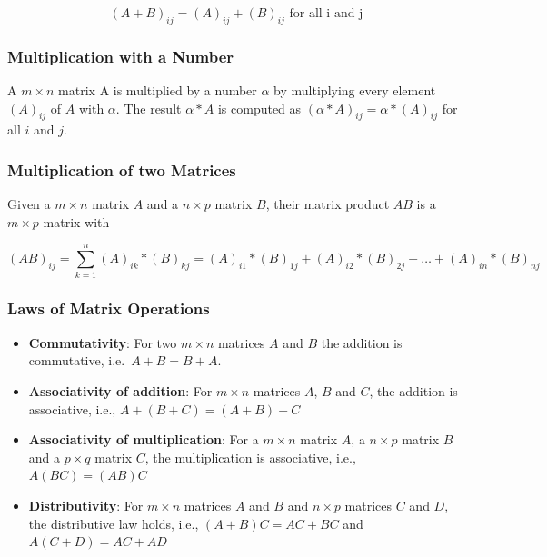 \documentclass[
]{book}
\providecommand{\tightlist}{%
  \setlength{\itemsep}{0pt}\setlength{\parskip}{0pt}}
\begin{document}
\[(A+B)_{ij} = (A)_{ij} + (B)_{ij} \text{ for all i and j}\]

\hypertarget{intro-linalg-matrix-multiplication-with-number}{%
\subsubsection{Multiplication with a Number}\label{intro-linalg-matrix-multiplication-with-number}}

A \(m\times n\) matrix A is multiplied by a number \(\alpha\) by multiplying every element \((A)_{ij}\) of \(A\) with \(\alpha\). The result \(\alpha * A\) is computed as \((\alpha * A)_{ij} = \alpha * (A)_{ij}\) for all \(i\) and \(j\).

\hypertarget{intro-linalg-multiplication-two-matrices}{%
\subsubsection{Multiplication of two Matrices}\label{intro-linalg-multiplication-two-matrices}}

Given a \(m\times n\) matrix \(A\) and a \(n\times p\) matrix \(B\), their matrix product \(AB\) is a \(m\times p\) matrix with

\[ (AB)_{ij} = \sum_{k=1}^n (A)_{ik} * (B)_{kj} = (A)_{i1} * (B)_{1j} + (A)_{i2} * (B)_{2j} + \ldots + (A)_{in} * (B)_{nj}\]

\hypertarget{intro-linalg-laws-matrix-operations}{%
\subsubsection{Laws of Matrix Operations}\label{intro-linalg-laws-matrix-operations}}

\begin{itemize}
\tightlist
\item
  \textbf{Commutativity}: For two \(m\times n\) matrices \(A\) and \(B\) the addition is commutative, i.e.~\(A + B = B + A\).
\item
  \textbf{Associativity of addition}: For \(m\times n\) matrices \(A\), \(B\) and \(C\), the addition is associative, i.e., \(A + (B + C) = (A + B) + C\)
\item
  \textbf{Associativity of multiplication}: For a \(m\times n\) matrix \(A\), a \(n \times p\) matrix \(B\) and a \(p \times q\) matrix \(C\), the multiplication is associative, i.e., \(A(BC) = (AB)C\)
\item
  \textbf{Distributivity}: For \(m\times n\) matrices \(A\) and \(B\) and \(n\times p\) matrices \(C\) and \(D\), the distributive law holds, i.e., \((A+B)C = AC + BC\) and \(A(C + D) = AC + AD\)
\end{itemize}
\end{document}
